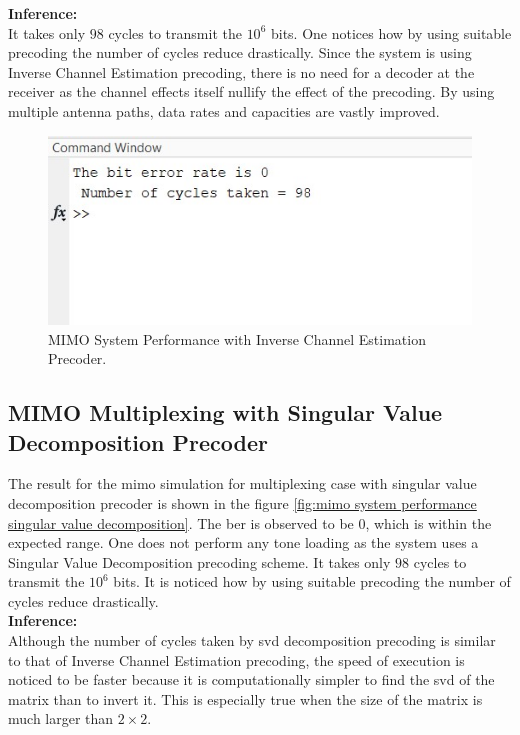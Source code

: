 \textbf{Inference:}\\
It takes only $98$ cycles to transmit the $10^6$ bits. One notices how by using suitable precoding the number of cycles reduce drastically. Since the system is using Inverse Channel Estimation precoding, there is no need for a decoder at the receiver as the channel effects itself nullify the effect of the precoding. By using multiple antenna paths, data rates and capacities are vastly improved.

\begin{figure}[!htbp]
\centering
\includegraphics[scale=1]{Chapter 4/Figures/MIMO System Performance Inverse Channel Estimation}
\caption{MIMO System Performance with Inverse Channel Estimation Precoder.}
\label{fig:mimo system performance inverse channel estimation}
\end{figure}

\subsection{MIMO Multiplexing with Singular Value Decomposition Precoder}

The result for the \acrshort{mimo} simulation for multiplexing case with singular value decomposition precoder is shown in the figure \ref{fig:mimo system performance singular value decomposition}. The \acrshort{ber} is observed to be $0$, which is within the expected range. One does not perform any tone loading as the system uses a Singular Value Decomposition precoding scheme. It takes only $98$ cycles to transmit the $10^6$ bits. It is noticed how by using suitable precoding the number of cycles reduce drastically.\\

\textbf{Inference:}\\
Although the number of cycles taken by \acrshort{svd} decomposition precoding is similar to that of Inverse Channel Estimation precoding, the speed of execution is noticed to be faster because it is computationally simpler to find the \acrshort{svd} of the matrix than to invert it. This is especially true when the size of the matrix is much larger than $2 \times 2$.

